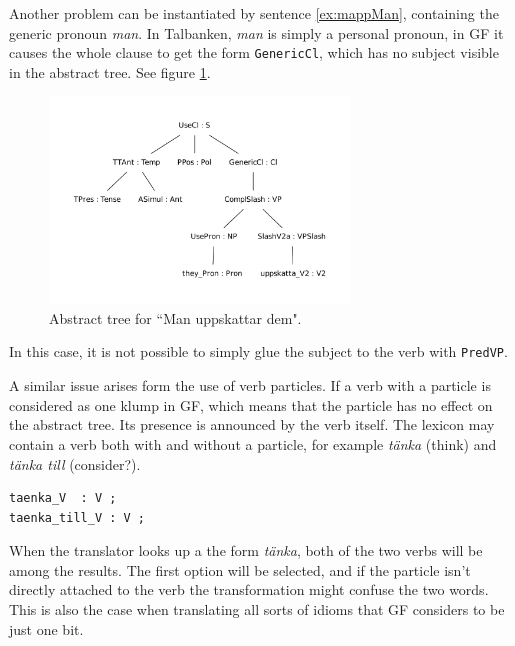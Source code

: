 \documentclass{report}
\begin{document}
Another problem can be instantiated by sentence \ref{ex:mappMan}, containing the generic pronoun \emph{man}.
\label{ex:mappMan} %
In Talbanken, \emph{man} is simply a personal pronoun, 
in GF it causes the whole clause to get the form \verb|GenericCl|, which has no
subject visible in the abstract tree. See figure \ref{fig:mappMan}.
\begin{figure}[h]
\centering
\includegraphics[width=80mm]{man.pdf}
\caption{Abstract tree for ``Man uppskattar dem".}
\label{fig:mappMan}
\end{figure}
In this case, it is not possible to simply glue the subject to the verb with \verb|PredVP|.

A similar issue arises form the use of verb particles. If a verb with a particle is considered
as one klump in GF, which means that the particle has no effect on the abstract tree. Its presence
is announced by the verb itself. The lexicon may contain a verb both with and without a particle,
for example \emph{tänka} (think) and \emph{tänka till} (consider?).
\begin{verbatim}
taenka_V  : V ;
taenka_till_V : V ;
\end{verbatim}
When the translator looks up a the form \emph{tänka}, both of the two verbs
will be among the results. The first option will be selected, and if the
particle isn't directly attached to the verb
the transformation might confuse the two words. This is also the case when translating
all sorts of idioms that GF considers to be just one bit.\\

\end{document}
